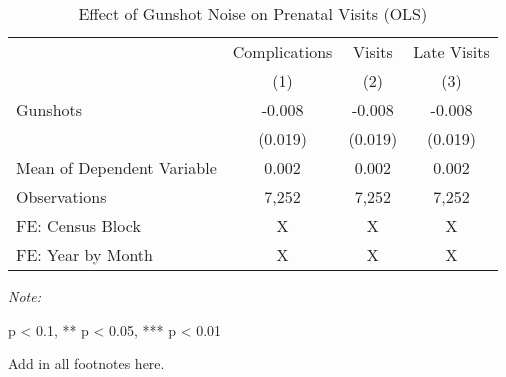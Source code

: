 \begin{table}[H]
\centering
\caption{\label{mechanism_table}Effect of Gunshot Noise on Prenatal Visits (OLS)}
\centering
\begin{threeparttable}
\fontsize{11}{13}\selectfont
\begin{tabular}[t]{>{\raggedright\arraybackslash}p{8cm}ccc}
\toprule
\multicolumn{1}{c}{ } & \multicolumn{1}{c}{Complications} & \multicolumn{1}{c}{Visits} & \multicolumn{1}{c}{Late Visits} \\
\cmidrule(l{3pt}r{3pt}){2-2} \cmidrule(l{3pt}r{3pt}){3-3} \cmidrule(l{3pt}r{3pt}){4-4}
  & (1) & (2) & (3)\\
\midrule
Gunshots & -0.008 & -0.008 & -0.008\\
 & (0.019) & (0.019) & (0.019)\\
Mean of Dependent Variable & 0.002 & 0.002 & 0.002\\
Observations & 7,252 & 7,252 & 7,252\\
FE: Census Block & X & X & X\\
\addlinespace
FE: Year by Month & X & X & X\\
\bottomrule
\end{tabular}
\begin{tablenotes}
\item \textit{Note: } 
\item * p < 0.1, ** p < 0.05, *** p < 0.01
\item Add in all footnotes here.
\end{tablenotes}
\end{threeparttable}
\end{table}
